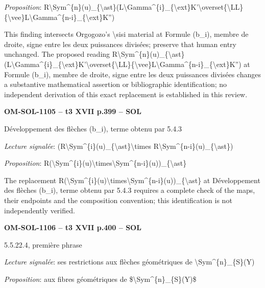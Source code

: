 \emph{Proposition}: R\textbackslash{}Sym\textasciicircum{}\{n\}(u)\_\{\textbackslash{}ast\}(L\textbackslash{}Gamma\textasciicircum{}\{i\}\_\{\textbackslash{}ext\}K'\textbackslash{}overset\{\textbackslash{}LL\}\{\textbackslash{}vee\}L\textbackslash{}Gamma\textasciicircum{}\{n-i\}\_\{\textbackslash{}ext\}K'')\par
This finding intersects Orgogozo's \textbackslash{}sisi material at Formule (b\_i), membre de droite, signe entre les deux puissances divisées; preserve that human entry unchanged. The proposed reading R\textbackslash{}Sym\textasciicircum{}\{n\}(u)\_\{\textbackslash{}ast\}(L\textbackslash{}Gamma\textasciicircum{}\{i\}\_\{\textbackslash{}ext\}K'\textbackslash{}overset\{\textbackslash{}LL\}\{\textbackslash{}vee\}L\textbackslash{}Gamma\textasciicircum{}\{n-i\}\_\{\textbackslash{}ext\}K'') at Formule (b\_i), membre de droite, signe entre les deux puissances divisées changes a substantive mathematical assertion or bibliographic identification; no independent derivation of this exact replacement is established in this review.\par
\par\noindent\textbf{OM-SOL-1105 -- t3 XVII p.399 -- SOL}\par
Développement des flèches (b\_i), terme obtenu par 5.4.3\par
\emph{Lecture signalée}: (R\textbackslash{}Sym\textasciicircum{}\{i\}(u)\_\{\textbackslash{}ast\}\textbackslash{}times R\textbackslash{}Sym\textasciicircum{}\{n-i\}(u)\_\{\textbackslash{}ast\})\par
\emph{Proposition}: R(\textbackslash{}Sym\textasciicircum{}\{i\}(u)\textbackslash{}times\textbackslash{}Sym\textasciicircum{}\{n-i\}(u))\_\{\textbackslash{}ast\}\par
The replacement R(\textbackslash{}Sym\textasciicircum{}\{i\}(u)\textbackslash{}times\textbackslash{}Sym\textasciicircum{}\{n-i\}(u))\_\{\textbackslash{}ast\} at Développement des flèches (b\_i), terme obtenu par 5.4.3 requires a complete check of the maps, their endpoints and the composition convention; this identification is not independently verified.\par
\par\noindent\textbf{OM-SOL-1106 -- t3 XVII p.400 -- SOL}\par
5.5.22.4, première phrase\par
\emph{Lecture signalée}: ses restrictions aux flèches géométriques de \textbackslash{}Sym\textasciicircum{}\{n\}\_\{S\}(Y)\par
\emph{Proposition}: aux fibres géométriques de \$\textbackslash{}Sym\textasciicircum{}\{n\}\_\{S\}(Y)\$\par
